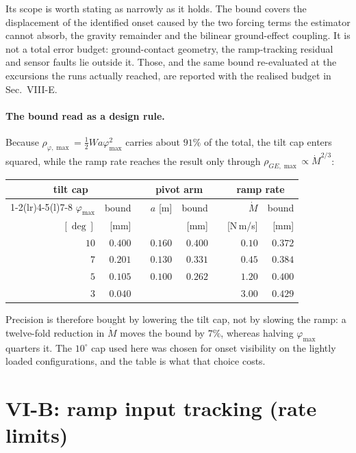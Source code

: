 \documentclass[10pt]{article}
\begin{document}
Its scope is worth stating as narrowly as it holds. The bound covers the
displacement of the identified onset caused by the two forcing terms the
estimator cannot absorb, the gravity remainder and the bilinear
ground-effect coupling. It is not a total error budget: ground-contact
geometry, the ramp-tracking residual and sensor faults lie outside it.
Those, and the same bound re-evaluated at the excursions the runs
actually reached, are reported with the realised budget in Sec.~VIII-E.

\paragraph{The bound read as a design rule.}
Because $\rho_{\varphi,\max} = \tfrac12Wa\varphi_{\max}^2$ carries about
$91\%$ of the total, the tilt cap enters squared, while the ramp rate
reaches the result only through $\rho_{GE,\max}\propto\dot M^{2/3}$:

\begin{center}\small
\begin{tabular}{@{}rrcrrcrr@{}}
\toprule
\multicolumn{2}{c}{tilt cap} && \multicolumn{2}{c}{pivot arm} &&
\multicolumn{2}{c}{ramp rate} \\
\cmidrule(r){1-2}\cmidrule(lr){4-5}\cmidrule(l){7-8}
$\varphi_{\max}$ & bound && $a$ [m] & bound && $\dot M$ & bound \\
$[\deg]$ & [mm] &&  & [mm] && [N\,m/s] & [mm] \\
\midrule
$10$ & $0.400$ && $0.160$ & $0.400$ && $0.10$ & $0.372$ \\
$7$  & $0.201$ && $0.130$ & $0.331$ && $0.45$ & $0.384$ \\
$5$  & $0.105$ && $0.100$ & $0.262$ && $1.20$ & $0.400$ \\
$3$  & $0.040$ &&         &         && $3.00$ & $0.429$ \\
\bottomrule
\end{tabular}
\end{center}

Precision is therefore bought by lowering the tilt cap, not by slowing
the ramp: a twelve-fold reduction in $\dot M$ moves the bound by $7\%$,
whereas halving $\varphi_{\max}$ quarters it. The $10^\circ$ cap used
here was chosen for onset visibility on the lightly loaded
configurations, and the table is what that choice costs.

\section*{VI-B: ramp input tracking (rate limits)}
\end{document}

